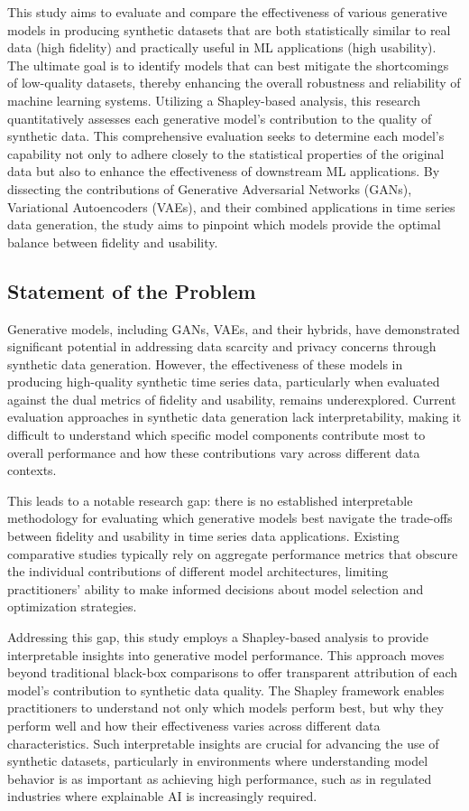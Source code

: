 \documentclass{article}
\begin{document}
This study aims to evaluate and compare the effectiveness of various generative models in producing synthetic datasets that are both statistically similar to real data (high fidelity) and practically useful in ML applications (high usability). The ultimate goal is to identify models that can best mitigate the shortcomings of low-quality datasets, thereby enhancing the overall robustness and reliability of machine learning systems. Utilizing a Shapley-based analysis, this research quantitatively assesses each generative model's contribution to the quality of synthetic data. This comprehensive evaluation seeks to determine each model's capability not only to adhere closely to the statistical properties of the original data but also to enhance the effectiveness of downstream ML applications. By dissecting the contributions of Generative Adversarial Networks (GANs), Variational Autoencoders (VAEs), and their combined applications in time series data generation, the study aims to pinpoint which models provide the optimal balance between fidelity and usability.
\subsection{Statement of the Problem}

Generative models, including GANs, VAEs, and their hybrids, have demonstrated significant potential in addressing data scarcity and privacy concerns through synthetic data generation. However, the effectiveness of these models in producing high-quality synthetic time series data, particularly when evaluated against the dual metrics of fidelity and usability, remains underexplored. Current evaluation approaches in synthetic data generation lack interpretability, making it difficult to understand which specific model components contribute most to overall performance and how these contributions vary across different data contexts.

This leads to a notable research gap: there is no established interpretable methodology for evaluating which generative models best navigate the trade-offs between fidelity and usability in time series data applications. Existing comparative studies typically rely on aggregate performance metrics that obscure the individual contributions of different model architectures, limiting practitioners' ability to make informed decisions about model selection and optimization strategies.

Addressing this gap, this study employs a Shapley-based analysis to provide interpretable insights into generative model performance. This approach moves beyond traditional black-box comparisons to offer transparent attribution of each model's contribution to synthetic data quality. The Shapley framework enables practitioners to understand not only which models perform best, but why they perform well and how their effectiveness varies across different data characteristics. Such interpretable insights are crucial for advancing the use of synthetic datasets, particularly in environments where understanding model behavior is as important as achieving high performance, such as in regulated industries where explainable AI is increasingly required.
\end{document}
